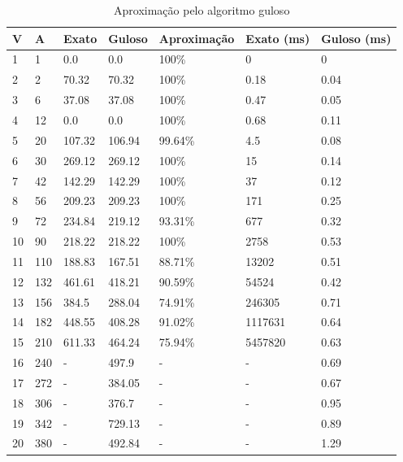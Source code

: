 \documentclass{article}
\begin{document}
\begin{table}
\centering
\begin{tabular}{ |l|l|l|l|l|l|l| }
  \hline
  V & A & Exato & Guloso & Aproximação & Exato (ms) & Guloso (ms) \\
  \hline
  1  & 1   &  0.0    & 0.0   & 100\%      & 0   & 0    \\
  2  & 2   &  70.32  & 70.32 & 100\%      & 0.18 & 0.04 \\
  3  & 6   &  37.08  & 37.08 & 100\%      & 0.47 & 0.05 \\               
  4  & 12  &  0.0    & 0.0     & 100\%    & 0.68 & 0.11 \\               
  5  & 20  &  107.32 & 106.94  & 99.64\%  & 4.5 & 0.08 \\              
  6  & 30  &  269.12 & 269.12  & 100\%    & 15 & 0.14 \\               
  7  & 42  &  142.29 & 142.29  & 100\%    & 37 & 0.12 \\               
  8  & 56  &  209.23 & 209.23  & 100\%    & 171 & 0.25 \\               
  9  & 72  &  234.84 & 219.12  & 93.31\%  & 677 & 0.32 \\
  10 & 90  &  218.22 & 218.22  & 100\%    & 2758 & 0.53 \\               
  11 & 110 & 188.83 & 167.51    & 88.71\% & 13202 & 0.51 \\               
  12 & 132 & 461.61 & 418.21    & 90.59\% & 54524 & 0.42 \\               
  13 & 156 & 384.5  & 288.04    & 74.91\% & 246305 & 0.71 \\               
  14 & 182 & 448.55 & 408.28    & 91.02\% & 1117631 & 0.64 \\               
  15 & 210 & 611.33 & 464.24    & 75.94\% & 5457820 & 0.63 \\               
  16 & 240 & -      & 497.9     & -       & -       & 0.69 \\               
  17 & 272 & -      & 384.05    & -       & -       & 0.67 \\               
  18 & 306 & -      & 376.7     & -       & -       & 0.95 \\               
  19 & 342 & -      & 729.13    & -       & -       & 0.89 \\               
  20 & 380 & -      & 492.84    & -       & -       & 1.29 \\               
  \hline
\end{tabular}
\caption{Aproximação pelo algoritmo guloso}
\label{tab:greedy_approximation}
\end{table}
\end{document}
